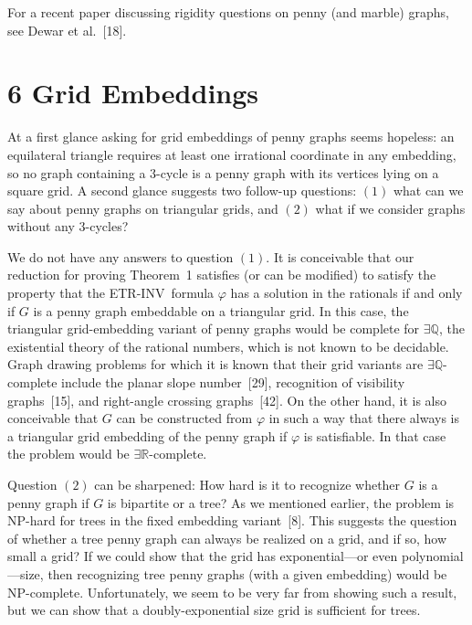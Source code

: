 \documentclass{article}
\begin{document}
For a recent paper discussing rigidity questions on penny (and marble) graphs, see Dewar et al.~[18].

\section*{6 Grid Embeddings}

At a first glance asking for grid embeddings of penny graphs seems hopeless: an equilateral triangle requires at least one irrational coordinate in any embedding, so no graph containing a $3$-cycle is a penny graph with its vertices lying on a square grid. A second glance suggests two follow-up questions: $(1)$ what can we say about penny graphs on triangular grids, and $(2)$ what if we consider graphs without any $3$-cycles?

We do not have any answers to question $(1)$. It is conceivable that our reduction for proving Theorem~1 satisfies (or can be modified) to satisfy the property that the \textnormal{\textsc{ETR-INV}}\ formula $\varphi$ has a solution in the rationals if and only if $G$ is a penny graph embeddable on a triangular grid. In this case, the triangular grid-embedding variant of penny graphs would be complete for \ensuremath{\exists\mathbb{Q}}, the existential theory of the rational numbers, which is not known to be decidable. Graph drawing problems for which it is known that their grid variants are \ensuremath{\exists\mathbb{Q}}-complete include the planar slope number~[29], recognition of visibility graphs~[15], and right-angle crossing graphs~[42]. On the other hand, it is also conceivable that $G$ 
can be constructed from $\varphi$ in such a way that there always is a triangular grid embedding of the penny graph if $\varphi$ is satisfiable. In that case the problem would be \ensuremath{\exists\mathbb{R}}-complete.

Question $(2)$ can be sharpened: How hard is it to recognize whether $G$ is a penny graph if $G$ is bipartite or a tree? As we mentioned earlier, the problem is \textsf{NP}-hard for trees 
in the fixed embedding variant~[8]. This suggests the question of whether a tree penny graph can always be realized on a grid, and if so, how small a grid? If we could show that the grid has exponential---or even polynomial---size, then recognizing tree penny graphs (with a given embedding) would be \textsf{NP}-complete. Unfortunately, we seem to be very far from showing such a result, but we can show that a doubly-exponential size grid is sufficient for trees.
\end{document}
